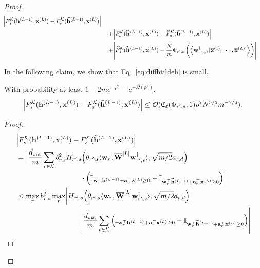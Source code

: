 \begin{claim}
\begin{proof}
\begin{align}
					\abs{F^{\mathcal{K}}_s(\mathbf{h}^{(L-1)}, \mathbf{x}^{(L)}) - F^{\mathcal{K}}_s(\widetilde{\mathbf{h}}^{(L-1)}, \mathbf{x}^{(L)})} \label{eq:diffhtildeh}\\&
					\quad + \abs{F^{\mathcal{K}}_s(\widetilde{\mathbf{h}}^{(L-1)}, \mathbf{x}^{(L)}) - \widetilde{F}^{\mathcal{K}}_s(\widetilde{\mathbf{h}}^{(L-1)}, \mathbf{x}^{(L)})} \label{eq:diffftildef}
					\\&
					\quad + \abs{\widetilde{F}^{\mathcal{K}}_s(\widetilde{\mathbf{h}}^{(L-1)}, \mathbf{x}^{(L)}) - \frac{N}{m} \Phi_{r', s} \left(\left\langle \mathbf{w}_{r', s}^{\dagger}, [\overline{\mathbf{x}}^{(1)}, \cdots, \overline{\mathbf{x}}^{(L)}]\right\rangle\right)} \label{eq:difftildefphi}  
				\end{align}
				
				In the following claim, we show that Eq.~\ref{eq:diffhtildeh} is small.
				\begin{claim}\label{claim:diffhtildeh}
					With probability at least $1 - 2me^{-\rho^2} - e^{-\Omega(\rho^2)}$,
					\begin{equation*}
						\abs{F^{\mathcal{K}}_s(\mathbf{h}^{(L-1)}, \mathbf{x}^{(L)}) - F^{\mathcal{K}}_s(\widetilde{\mathbf{h}}^{(L-1)}, \mathbf{x}^{(L)})} \le \mathcal{O}( \mathfrak{C}_{\varepsilon}(\Phi_{r', s}, 1) \rho^{7} N^{5 / 3} m^{-7/6}).
					\end{equation*}
				\end{claim}
				
				\begin{proof}
					\begin{align*}
						&\abs{F^{\mathcal{K}}_s(\mathbf{h}^{(L-1)}, \mathbf{x}^{(L)}) - F^{\mathcal{K}}_s(\widetilde{\mathbf{h}}^{(L-1)}, \mathbf{x}^{(L)})}\\ &= 
						\Big|\frac{d_{\mathrm{out}} }{m} \sum_{r \in \mathcal{K}} b_{r, s}^2 H_{r', s}\Big(\theta_{r', s} \langle \mathbf{w}_{r}, \overline{\mathbf{W}}^{[L]} \mathbf{w}_{r', s}^{\dagger}\rangle, \sqrt{m/2} a_{r, d}\Big)
						\\& \quad\quad\quad\quad\quad\quad\quad\quad\quad
						\cdot \left(\mathbb{I}_{\mathbf{w}_r^{\top} \mathbf{h}^{(L-1)} + \mathbf{a}_r^{\top} \mathbf{x}^{(L)} \ge 0} - \mathbb{I}_{\mathbf{w}_r^{\top} \widetilde{\mathbf{h}}^{(L-1)} + \mathbf{a}_r^{\top} \mathbf{x}^{(L)} \ge 0}\right)\Big| \\&
						\le \max_{r} b^{2}_{r, s} \max_{r} \abs{H_{r', s}\Big(\theta_{r', s} \langle \mathbf{w}_{r}, \overline{\mathbf{W}}^{[L]} \mathbf{w}_{r', s}^{\dagger}\rangle, \sqrt{m/2} a_{r, d}\Big)}  
						\\& \quad \quad \quad \quad \quad \quad \quad \quad \quad
						\abs{\frac{d_{\mathrm{out}} }{m} \sum_{r \in \mathcal{K}} \left(\mathbb{I}_{\mathbf{w}_r^{\top} \mathbf{h}^{(L-1)} + \mathbf{a}_r^{\top} \mathbf{x}^{(L)} \ge 0} - \mathbb{I}_{\mathbf{w}_r^{\top} \widetilde{\mathbf{h}}^{(L-1)} + \mathbf{a}_r^{\top} \mathbf{x}^{(L)} \ge 0}\right)} 
					\end{align*}
					

\end{proof}
\end{proof}
\end{claim}
